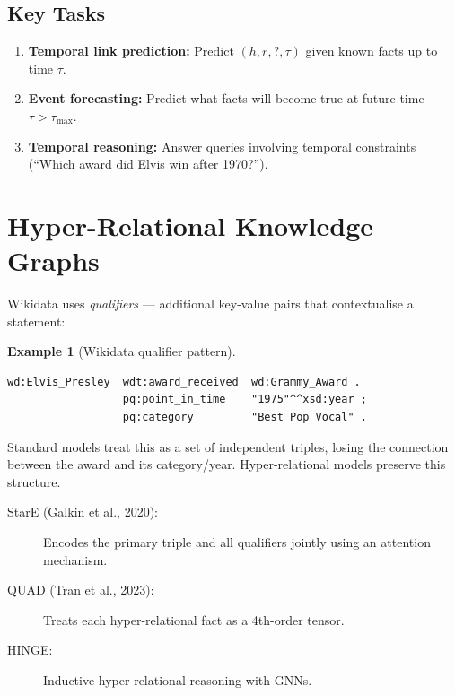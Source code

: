 \documentclass[11pt,a4paper,oneside,openany]{book}
\theoremstyle{definition}
\newtheorem{example}{Example}[chapter]
\theoremstyle{plain}
\theoremstyle{remark}
\begin{document}
\subsection{Key Tasks}

\begin{enumerate}
	\item \textbf{Temporal link prediction:} Predict $(h, r, ?, \tau)$ given known facts up to time $\tau$.
	\item \textbf{Event forecasting:} Predict what facts will become true at future time $\tau > \tau_{\max}$.
	\item \textbf{Temporal reasoning:} Answer queries involving temporal constraints (``Which award did Elvis win after 1970?'').
\end{enumerate}

\section{Hyper-Relational Knowledge Graphs}\label{sec:hyper-rel}

Wikidata uses \emph{qualifiers} --- additional key-value pairs that contextualise a statement:

\begin{example}[Wikidata qualifier pattern]
	\begin{lstlisting}[language=XML,numbers=none]
wd:Elvis_Presley  wdt:award_received  wd:Grammy_Award .
                  pq:point_in_time    "1975"^^xsd:year ;
                  pq:category         "Best Pop Vocal" .
\end{lstlisting}
\end{example}

Standard models treat this as a set of independent triples, losing the connection between the award and its category/year. Hyper-relational models preserve this structure.

\begin{description}
	\item[StarE (Galkin et al., 2020):] Encodes the primary triple and all qualifiers jointly using an attention mechanism.
	\item[QUAD (Tran et al., 2023):] Treats each hyper-relational fact as a 4th-order tensor.
	\item[HINGE:] Inductive hyper-relational reasoning with GNNs.
\end{description}

\end{document}
